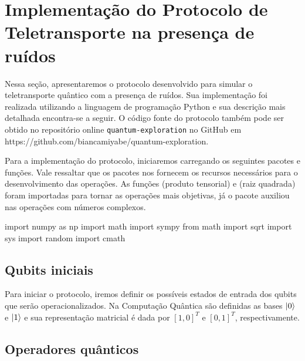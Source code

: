 
\chapter{Implementação do Protocolo de Teletransporte na presença de ruídos}\label{app:protocolo}

Nessa seção, apresentaremos o protocolo desenvolvido para simular o teletransporte quântico com a presença de ruídos. Sua implementação foi realizada utilizando a linguagem de programação Python e sua descrição mais detalhada encontra-se a seguir. O código fonte do protocolo também pode ser obtido no repositório online \texttt{quantum-exploration} no GitHub em \hypertarget{repositório}{https://github.com/biancamiyabe/quantum-exploration}.

Para a implementação do protocolo, iniciaremos carregando os seguintes pacotes e funções. Vale ressaltar que os pacotes nos fornecem os recursos necessários para o desenvolvimento das operações. As funções  (produto tensorial) e  (raiz quadrada) foram importadas para tornar as operações mais objetivas, já o pacote  auxiliou nas operações com números complexos.
\begin{pycode}
    import numpy as np
    import math
    import sympy
    from math import sqrt
    import sys
    import random
    import cmath
\end{pycode}


\section{Qubits iniciais}\label{qubits-iniciais}

Para iniciar o protocolo, iremos definir os possíveis estados de entrada dos qubits que serão operacionalizados. Na Computação Quântica são definidas as bases \(\ket{0}\) e \(\ket{1}\) e sua representação matricial é dada por \([1, 0]^{T}\) e \([0, 1]^{T}\), respectivamente.

\section{Operadores quânticos}\label{operadores-quuxe2nticos}

